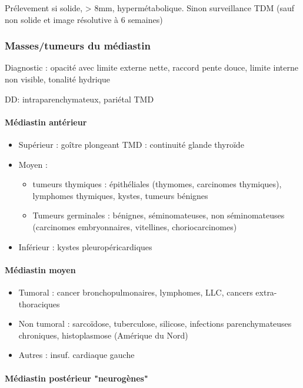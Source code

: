 \documentclass[11pt]{article}
\begin{document}
Prélevement si solide, > 8mm, hypermétabolique. Sinon surveillance TDM (sauf non solide et image résolutive à 6 semaines)

\subsubsection{Masses/tumeurs du médiastin}
\label{sec:org1805799}
Diagnostic : opacité avec limite externe nette, raccord pente douce, limite interne non
visible, tonalité hydrique

DD: intraparenchymateux, pariétal \thus TMD

\paragraph{Médiastin antérieur}
\label{sec:orgdbb0df6}

\begin{itemize}
\item Supérieur : goître plongeant \thus TMD : continuité glande thyroïde
\item Moyen : 

\begin{itemize}
\item tumeurs thymiques : épithéliales (thymomes, carcinomes thymiques),
lymphomes thymiques, kystes, tumeurs bénignes
\item Tumeurs germinales : bénignes, séminomateuses, non séminomateuses
(carcinomes embryonnaires, vitellines, choriocarcinomes)
\end{itemize}

\item Inférieur : kystes pleuropéricardiques
\end{itemize}


\paragraph{Médiastin moyen}
\label{sec:org5bd59d2}

\begin{itemize}
\item Tumoral : cancer bronchopulmonaires, lymphomes, LLC, cancers
extra-thoraciques
\item Non tumoral : sarcoïdose, tuberculose, silicose, infections
parenchymateuses chroniques, histoplasmose (Amérique du Nord)
\item Autres : insuf. cardiaque gauche
\end{itemize}


\paragraph{Médiastin postérieur "neurogènes"}
\label{sec:org6c7ea20}
\end{document}
